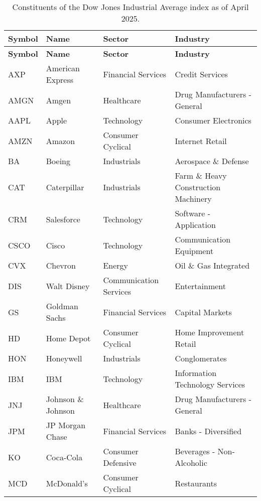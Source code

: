 \begin{longtable}{|p{2cm}|p{3cm}|p{4cm}|p{4cm}|}
\caption{Constituents of the Dow Jones Industrial Average index as of April 2025. \cite{WikipediaDowJones30}}
\label{tab:dow30constituents}
\\ 
\hline
\textbf{Symbol} & \textbf{Name} & \textbf{Sector} & \textbf{Industry} \\ \midrule
\endfirsthead

\hline
\textbf{Symbol} & \textbf{Name} & \textbf{Sector} & \textbf{Industry} \\ \midrule
\endhead

\endfoot

\hline
AXP & American Express & Financial Services & Credit Services \\ \hline
AMGN & Amgen & Healthcare & Drug Manufacturers - General \\ \hline
AAPL & Apple & Technology & Consumer Electronics \\ \hline
AMZN & Amazon & Consumer Cyclical & Internet Retail \\ \hline
BA & Boeing & Industrials & Aerospace \& Defense \\ \hline
CAT & Caterpillar & Industrials & Farm \& Heavy Construction Machinery \\ \hline
CRM & Salesforce & Technology & Software - Application \\ \hline
CSCO & Cisco & Technology & Communication Equipment \\ \hline
CVX & Chevron & Energy & Oil \& Gas Integrated \\ \hline
DIS & Walt Disney & Communication Services & Entertainment \\ \hline
GS & Goldman Sachs & Financial Services & Capital Markets \\ \hline
HD & Home Depot & Consumer Cyclical & Home Improvement Retail \\ \hline
HON & Honeywell & Industrials & Conglomerates \\ \hline
IBM & IBM & Technology & Information Technology Services \\ \hline
JNJ & Johnson \& Johnson & Healthcare & Drug Manufacturers - General \\ \hline
JPM & JP Morgan Chase & Financial Services & Banks - Diversified \\ \hline
KO & Coca-Cola & Consumer Defensive & Beverages - Non-Alcoholic \\ \hline
MCD & McDonald's & Consumer Cyclical & Restaurants \\ \hline

\end{longtable}
